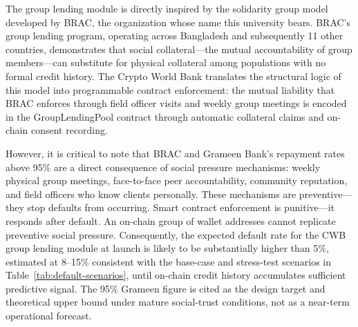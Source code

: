 \documentclass[12pt,a4paper]{report}
\begin{document}
The group lending module is directly inspired by the solidarity group model developed by BRAC, the organization whose name this university bears. BRAC's group lending program, operating across Bangladesh and subsequently 11 other countries, demonstrates that social collateral---the mutual accountability of group members---can substitute for physical collateral among populations with no formal credit history. The Crypto World Bank translates the structural logic of this model into programmable contract enforcement: the mutual liability that BRAC enforces through field officer visits and weekly group meetings is encoded in the GroupLendingPool contract through automatic collateral claims and on-chain consent recording.

However, it is critical to note that BRAC and Grameen Bank's repayment rates above 95\% are a direct consequence of social pressure mechanisms: weekly physical group meetings, face-to-face peer accountability, community reputation, and field officers who know clients personally. These mechanisms are preventive---they stop defaults from occurring. Smart contract enforcement is punitive---it responds after default. An on-chain group of wallet addresses cannot replicate preventive social pressure. Consequently, the expected default rate for the CWB group lending module at launch is likely to be substantially higher than 5\%, estimated at 8--15\% consistent with the base-case and stress-test scenarios in Table~\ref{tab:default-scenarios}, until on-chain credit history accumulates sufficient predictive signal. The 95\% Grameen figure is cited as the design target and theoretical upper bound under mature social-trust conditions, not as a near-term operational forecast.
\end{document}
